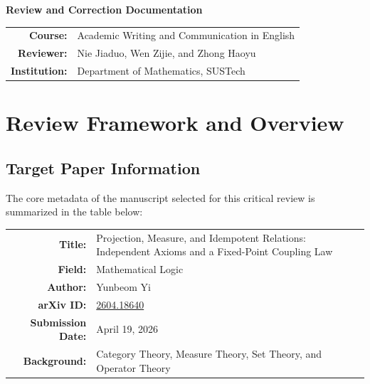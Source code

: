 \documentclass[11pt, a4paper]{article}
\begin{document}

\begin{titlepage}
    \vspace*{\fill}
    \begin{center}
        {\Huge \bfseries Review and Correction Documentation \par}
        \vspace{2.5cm} %

        {\Large 
        \renewcommand{\arraystretch}{1.8} %
        \begin{tabular}{r l}
            \textbf{Course:} & Academic Writing and Communication in English \\
            \textbf{Reviewer:} & Nie Jiaduo, Wen Zijie, and Zhong Haoyu \\
            \textbf{Institution:} & Department of Mathematics, SUSTech \\
        \end{tabular}
        \par}
    \end{center}
    \vspace*{\fill}
\end{titlepage}

\newpage
\tableofcontents
\newpage






\section{Review Framework and Overview}

\subsection{Target Paper Information}

The core metadata of the manuscript selected for this critical review is summarized in the table below:

\begin{center}
    \renewcommand{\arraystretch}{1.5} %
    \begin{tabularx}{0.95\textwidth}{r X} %
        \textbf{Title:} & Projection, Measure, and Idempotent Relations: Independent Axioms and a Fixed-Point Coupling Law \\
        \textbf{Field:} & Mathematical Logic \\
        \textbf{Author:} & Yunbeom Yi \\
        \textbf{arXiv ID:} & \href{https://arxiv.org/abs/2604.18640}{2604.18640} \\
        \textbf{Submission Date:} & April 19, 2026 \\
        \textbf{Background:} & Category Theory, Measure Theory, Set Theory, and Operator Theory \\
    \end{tabularx}
\end{center}
\end{document}
